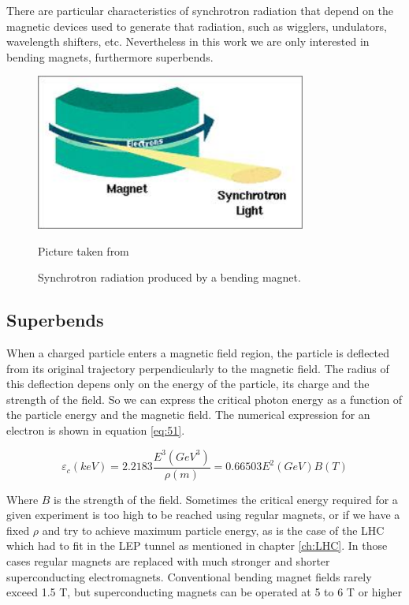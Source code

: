 There are particular characteristics of synchrotron radiation that depend on the magnetic devices used to generate that radiation, such as wigglers, undulators, wavelength shifters, etc. Nevertheless in this work we are only interested in bending magnets, furthermore superbends.

\begin{figure}
	\centering
  \begin{minipage}{\textwidth}
  	\centering
   	\includegraphics[width=3.5in]{Pictures/Syncrotron.jpg}
  		\caption{\label{fig:synsim}
   			Synchrotron radiation produced by a bending magnet.}
   			\footnotesize{Picture taken from \citep{fig:wiki1}}
   \end{minipage}
\end{figure}

\subsection{Superbends}
When a charged particle enters a magnetic field region, the particle is  deflected from its original trajectory perpendicularly to the magnetic field. The radius of this deflection depens only on the energy of the particle, its charge and the strength of the field. So we can express the critical photon energy as a function of the particle energy and the magnetic field. The numerical expression for an electron is shown in equation \ref{eq:51}\citep{libro}. 

\begin{equation}
\label{eq:51}
\varepsilon_{c}(keV) = 2.2183\dfrac{E^{3}(GeV^{3})}{\rho(m)}=0.66503E^{2}(GeV)B(T) 
\end{equation}

Where $B$ is the strength of the field. Sometimes the critical energy required for a given experiment is too high to be reached using regular magnets, or if we have a fixed $\rho$ and try to achieve maximum particle energy, as is the case of the LHC which had to fit in the LEP tunnel as mentioned in chapter \ref{ch:LHC}. In those cases regular magnets are replaced with much stronger and shorter superconducting electromagnets. Conventional bending magnet fields rarely exceed 1.5 T, but superconducting magnets can be operated at 5 to 6 T or higher\citep{libro}


